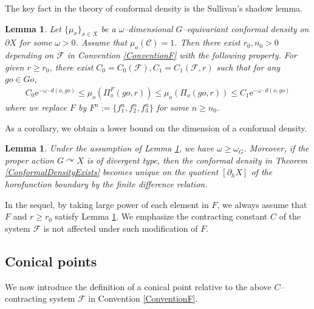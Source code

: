 \documentclass{amsart}
\newtheorem{lem}[thm]{Lemma}
\theoremstyle{definition}
\newtheorem{defn}[thm]{Definition}
\theoremstyle{remark}
\newcommand{\act}{\curvearrowright}
\newcommand{\f}{\mathscr F}
\newcommand{\U}{ X}
\newcommand{\hU}{\partial_h{  X}}
\newcommand{\pU}{\partial{  X}}
\newcommand{\e}[1]{\omega_{#1}}
\begin{document}
 


  



The key fact in the theory of conformal density is the Sullivan's  shadow lemma.
\begin{lem}\cite[Lemma 6.3]{YANG22}\label{ShadowLem}
Let $\{\mu_x\}_{x\in \U}$ be a $\omega$--dimensional $G$--equivariant conformal density on $\pU$ for some $\omega>0$. Assume that $\mu_o(\mathcal C)=1$. Then there exist $r_0,  n_0 > 0$ depending on $\f$ in Convention \ref{ConventionF} with the following property. 
For given $r \ge  r_0$, there exist $C_0=C_0(\f),C_1=C_1(\f, r)$ such that  for any $go\in Go$,
$$
\begin{array}{rl}
   C_0 \mathrm{e}^{-\omega \cdot  d(o, go)}  \le   \mu_o(\Pi_o^{F}(go,r))  \le \mu_o(\Pi_o(go,r))   \le C_1     \mathrm{e}^{-\omega \cdot  d(o, go)} 
\end{array}
$$
where we replace $F$ by $F^n:=\{f_1^n,f_2^n,f_3^n\}$ for some $n\ge n_0$. 
\end{lem}


As a corollary, we obtain a lower bound on the dimension of a conformal density.
\begin{lem}\cite[Proposition 6.8, Theorem 1.16]{YANG22}\label{UniqueConformalDensity}
Under the assumption of Lemma \ref{ShadowLem}, we have $\omega \ge \e G$.   Moreover,  if the proper action $G\act \U$ is of divergent type, then the conformal density in Theorem \ref{ConformalDensityExists} becomes unique on the quotient $[\hU]$ of the horofunction boundary by the finite difference relation.
\end{lem}

In the sequel, by taking large power of each element in $F$, we always assume that $F$ and $r\ge r_0$ satisfy Lemma \ref{ShadowLem}. We emphasize the contracting  constant $C$ of the system $\f$ is not affected under such modification of $F$.  


\subsection{Conical points}
We now introduce  the    definition  of a conical point relative to the above $C$--contracting system $\f$ in Convention \ref{ConventionF}. %

\end{document}
